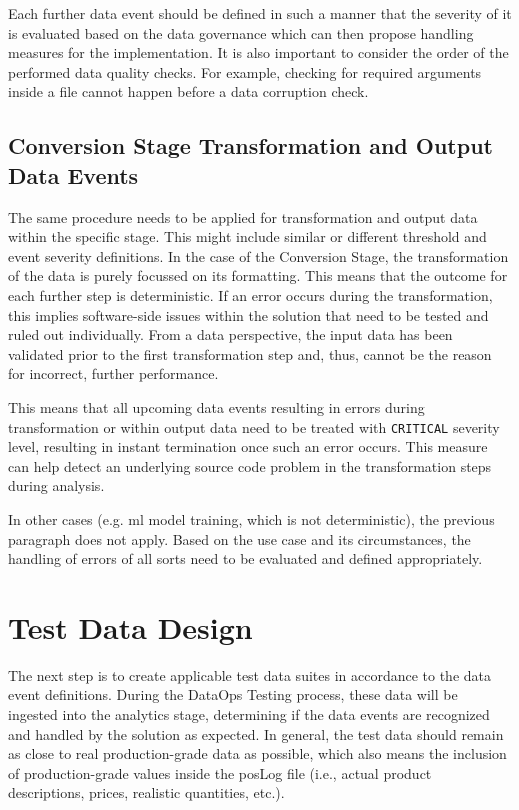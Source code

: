 Each further data event should be defined in such a manner that the severity of it is evaluated based on the data governance which can then propose handling measures for the implementation. It is also important to consider the order of the performed data quality checks. For example, checking for required arguments inside a file cannot happen before a data corruption check.

\subsection{Conversion Stage Transformation and Output Data Events} \label{sec:4-1-4}
The same procedure needs to be applied for transformation and output data within the specific stage. This might include similar or different threshold and event severity definitions. In the case of the Conversion Stage, the transformation of the data is purely focussed on its formatting. This means that the outcome for each further step is deterministic. If an error occurs during the transformation, this implies software-side issues within the solution that need to be tested and ruled out individually. From a data perspective, the input data has been validated prior to the first transformation step and, thus, cannot be the reason for incorrect, further performance.

This means that all upcoming data events resulting in errors during transformation or within output data need to be treated with \texttt{CRITICAL} severity level, resulting in instant termination once such an error occurs. This measure can help detect an underlying source code problem in the transformation steps during analysis.

In other cases (e.g. \acs{ml} model training, which is not deterministic), the previous paragraph does not apply. Based on the use case and its circumstances, the handling of errors of all sorts need to be evaluated and defined appropriately.

\section{Test Data Design} \label{sec:4-test-data-design}
The next step is to create applicable test data suites in accordance to the data event definitions. During the DataOps Testing process, these data will be ingested into the analytics stage, determining if the data events are recognized and handled by the solution as expected. In general, the test data should remain as close to real production-grade data as possible, which also means the inclusion of production-grade values inside the \ac{pos}Log file (i.e., actual product descriptions, prices, realistic quantities, etc.).

